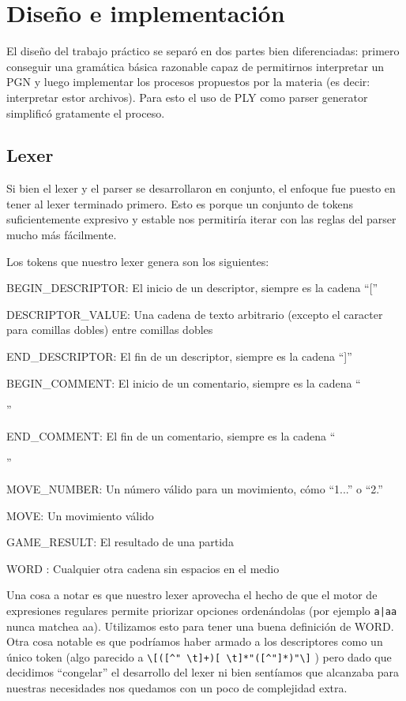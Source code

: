\section{Diseño e implementación}

El diseño del trabajo práctico se separó en dos partes bien diferenciadas: primero conseguir una gramática básica razonable capaz de permitirnos interpretar un PGN y luego implementar los procesos propuestos por la materia (es decir: interpretar estor archivos). Para esto el uso de PLY como parser generator simplificó gratamente el proceso.

\subsection{Lexer}

Si bien el lexer y el parser se desarrollaron en conjunto, el enfoque fue puesto en
tener al lexer terminado primero. Esto es porque un conjunto de tokens suficientemente
expresivo y estable nos permitiría iterar con las reglas del parser mucho más
fácilmente.

Los tokens que nuestro lexer genera son los siguientes:
\begin{itemize}
    \item BEGIN\_DESCRIPTOR: El inicio de un descriptor, siempre es la cadena ``[''
    \item DESCRIPTOR\_VALUE: Una cadena de texto arbitrario (excepto el caracter para comillas dobles) entre comillas dobles
    \item END\_DESCRIPTOR: El fin de un descriptor, siempre es la cadena ``]''
    \item BEGIN\_COMMENT: El inicio de un comentario, siempre es la cadena ``{''
    \item END\_COMMENT: El fin de un comentario, siempre es la cadena ``}''
    \item MOVE\_NUMBER: Un número válido para un movimiento, cómo ``1...'' o ``2.''
    \item MOVE: Un movimiento válido
    \item GAME\_RESULT: El resultado de una partida
    \item WORD : Cualquier otra cadena sin espacios en el medio
\end{itemize}


Una cosa a notar es que nuestro lexer aprovecha el hecho de que el motor de expresiones regulares permite priorizar opciones ordenándolas (por ejemplo \verb/a|aa/ nunca matchea aa). Utilizamos esto para tener una buena definición de WORD. Otra cosa notable es que podríamos haber armado a los descriptores como un único token (algo parecido a \verb/\[([^" \t]+)[ \t]*"([^"]*)"\]/ )  pero dado que decidimos ``congelar'' el desarrollo del lexer ni bien sentíamos que alcanzaba para nuestras necesidades nos quedamos con un poco de complejidad extra.

